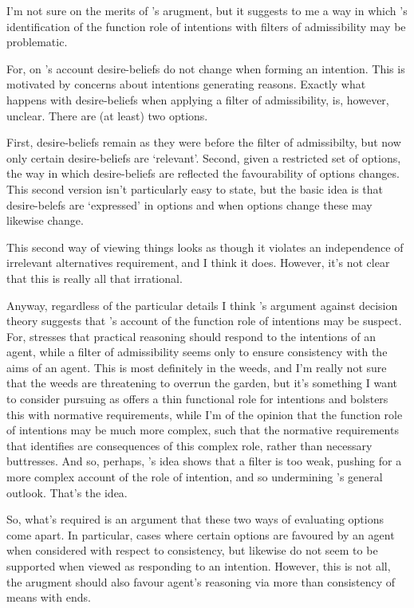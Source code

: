 \documentclass[10pt]{article}
\begin{document}
I'm not sure on the merits of \citeauthor{Broome:2002aa}'s arugment, but it suggests to me a way in which \citeauthor{Bratman:1987aa}'s identification of the function role of intentions with filters of admissibility may be problematic.

For, on \citeauthor{Bratman:1987aa}'s account desire-beliefs do not change when forming an intention.
This is motivated by concerns about intentions generating reasons.
Exactly what happens with desire-beliefs when applying a filter of admissibility, is, however, unclear.
There are (at least) two options.

First, desire-beliefs remain as they were before the filter of admissibilty, but now only certain desire-beliefs are `relevant'.
Second, given a restricted set of options, the way in which desire-beliefs are reflected the favourability of options changes.
This second version isn't particularly easy to state, but the basic idea is that desire-belefs are `expressed' in options and when options change these may likewise change.

This second way of viewing things looks as though it violates an independence of irrelevant alternatives requirement, and I think it does.
However, it's not clear that this is really all that irrational.

Anyway, regardless of the particular details I think \citeauthor{Broome:2002aa}'s argument against decision theory suggests that \citeauthor{Bratman:1987aa}'s account of the function role of intentions may be suspect.
For, \citeauthor{Broome:2002aa} stresses that practical reasoning should respond to the intentions of an agent, while a filter of admissibility seems only to ensure consistency with the aims of an agent.
This is most definitely in the weeds, and I'm really not sure that the weeds are threatening to overrun the garden, but it's something I want to consider pursuing as \citeauthor{Bratman:1987aa} offers a thin functional role for intentions and bolsters this with normative requirements, while I'm of the opinion that the function role of intentions may be much more complex, such that the normative requirements that \citeauthor{Bratman:1987aa} identifies are consequences of this complex role, rather than necessary buttresses.
And so, perhaps, \citeauthor{Broome:2002aa}'s idea shows that a filter is too weak, pushing for a more complex account of the role of intention, and so undermining \citeauthor{Bratman:1987aa}'s general outlook.
That's the idea.

So, what's required is an argument that these two ways of evaluating options come apart.
In particular, cases where certain options are favoured by an agent when considered with respect to consistency, but likewise do not seem to be supported when viewed as responding to an intention.
However, this is not all, the arugment should also favour agent's reasoning via more than consistency of means with ends.
\end{document}
